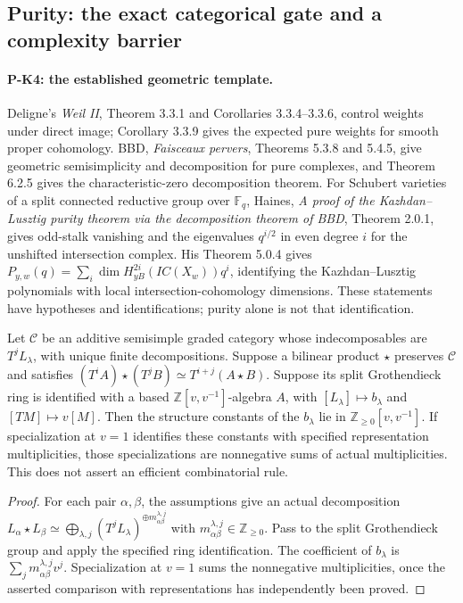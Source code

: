 \subsection{Purity: the exact categorical gate and a complexity barrier}

\paragraph{P-K4: the established geometric template.}
Deligne's \emph{Weil II}, Theorem 3.3.1 and Corollaries 3.3.4--3.3.6,
control weights under direct image; Corollary 3.3.9 gives the expected
pure weights for smooth proper cohomology. BBD, \emph{Faisceaux pervers}, Theorems 5.3.8 and 5.4.5,
give geometric semisimplicity and decomposition for pure complexes,
and Theorem 6.2.5 gives the characteristic-zero decomposition theorem.
For Schubert varieties of a split connected reductive group over
$\mathbb F_q$, Haines, \emph{A proof of the Kazhdan--Lusztig purity
theorem via the decomposition theorem of BBD}, Theorem 2.0.1,
gives odd-stalk vanishing and the eigenvalues $q^{i/2}$ in even degree
$i$ for the unshifted intersection complex. His Theorem 5.0.4 gives
$P_{y,w}(q)=\sum_i\dim H^{2i}_{yB}(IC(X_w))q^i$, identifying the
Kazhdan--Lusztig polynomials with local intersection-cohomology
dimensions. These statements have hypotheses and identifications;
purity alone is not that identification.

\begin{proposition}
\label{prop:categorical}
Let $\mathcal C$ be an additive semisimple graded category whose
indecomposables are $T^jL_\lambda$, with unique finite decompositions.
Suppose a bilinear product $\star$ preserves $\mathcal C$ and satisfies
$(T^iA)\star(T^jB)\simeq T^{i+j}(A\star B)$.
Suppose its split Grothendieck ring is identified with a based
$\mathbb Z[v,v^{-1}]$-algebra $A$, with $[L_\lambda]\mapsto b_\lambda$
and $[TM]\mapsto v[M]$. Then the structure constants of the
$b_\lambda$ lie in $\mathbb Z_{\ge0}[v,v^{-1}]$.
If specialization at $v=1$ identifies these constants with specified
representation multiplicities, those specializations are nonnegative
sums of actual multiplicities. This does not assert an efficient
combinatorial rule.
\end{proposition}
\begin{proof}
For each pair $\alpha,\beta$, the assumptions give an actual
decomposition
$L_\alpha\star L_\beta\simeq
\bigoplus_{\lambda,j}(T^jL_\lambda)^{\oplus m_{\alpha\beta}^{\lambda,j}}$
with $m_{\alpha\beta}^{\lambda,j}\in\mathbb Z_{\ge0}$.
Pass to the split Grothendieck group and apply the specified ring
identification. The coefficient of $b_\lambda$ is
$\sum_jm_{\alpha\beta}^{\lambda,j}v^j$.
Specialization at $v=1$ sums the nonnegative multiplicities, once the
asserted comparison with representations has independently been proved.
\end{proof}

